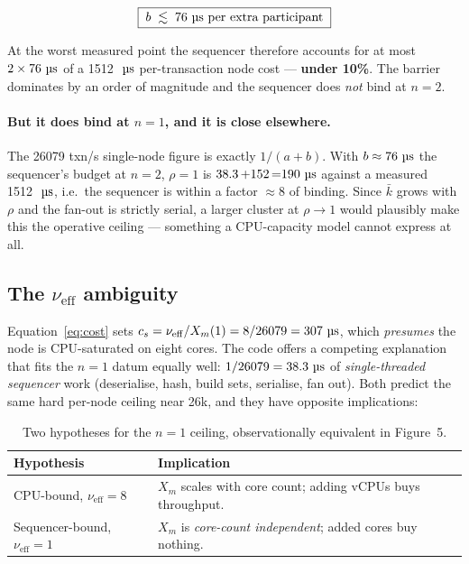 \documentclass[11pt,a4paper]{article}
\newcommand{\pernode}{X_m}
\newcommand{\msecs}{\ensuremath{\,\text{\textmu}\text{s}}}
\newcommand{\nueff}{\ensuremath{\nu_{\mathrm{eff}}}}
\begin{document}
$$\boxed{\;b \;\lesssim\; \SI{76}{\msecs}\ \text{per extra participant}\;}$$

At the worst measured point the sequencer therefore accounts for at most
$2\times\SI{76}{\msecs}$ of a \SI{1512}{\msecs} per-transaction node cost ---
\textbf{under 10\%}. The barrier dominates by an order of magnitude and the
sequencer does \emph{not} bind at $n{=}2$.

\paragraph{But it does bind at $n{=}1$, and it is close elsewhere.} The
\num{26079} txn/s single-node figure is exactly $1/(a+b)$. With $b\approx
\SI{76}{\msecs}$ the sequencer's budget at $n{=}2$, $\rho{=}1$ is
$\SI{38.3}+\SI{152}=\SI{190}{\msecs}$ against a measured \SI{1512}{\msecs},
i.e.\ the sequencer is within a factor $\approx8$ of binding. Since
$\bar{k}$ grows with $\rho$ and the fan-out is strictly serial, a larger
cluster at $\rho\to1$ would plausibly make this the operative ceiling ---
something a CPU-capacity model cannot express at all.

\subsection{The $\nueff$ ambiguity}
\label{sec:nueff}

Equation~\eqref{eq:cost} sets $c_s = \nueff/\pernode(1) = 8/26079 =
\SI{307}{\msecs}$, which \emph{presumes} the node is CPU-saturated on eight
cores. The code offers a competing explanation that fits the $n{=}1$ datum
equally well: $1/26079 = \SI{38.3}{\msecs}$ of \emph{single-threaded
sequencer} work (deserialise, hash, build sets, serialise, fan out). Both
predict the same hard per-node ceiling near \num{26}k, and they have opposite
implications:

\begin{table}[H]
\centering
\caption{Two hypotheses for the $n{=}1$ ceiling, observationally equivalent in
Figure~5.}
\begin{tabular}{@{}lp{9.2cm}@{}}
\toprule
\textbf{Hypothesis} & \textbf{Implication} \\
\midrule
CPU-bound, $\nueff{=}8$ &
  $\pernode$ scales with core count; adding vCPUs buys throughput. \\
Sequencer-bound, $\nueff{=}1$ &
  $\pernode$ is \emph{core-count independent}; added cores buy nothing. \\
\bottomrule
\end{tabular}
\end{table}
\end{document}
